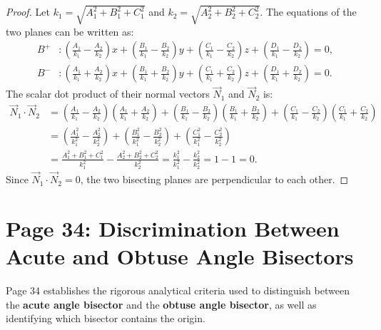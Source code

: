 \begin{proof}
Let $k_1 = \sqrt{A_1^2+B_1^2+C_1^2}$ and $k_2 = \sqrt{A_2^2+B_2^2+C_2^2}$.
The equations of the two planes can be written as:
\begin{align}
    B^+ &: \left(\frac{A_1}{k_1} - \frac{A_2}{k_2}\right)x + \left(\frac{B_1}{k_1} - \frac{B_2}{k_2}\right)y + \left(\frac{C_1}{k_1} - \frac{C_2}{k_2}\right)z + \left(\frac{D_1}{k_1} - \frac{D_2}{k_2}\right) = 0, \\
    B^- &: \left(\frac{A_1}{k_1} + \frac{A_2}{k_2}\right)x + \left(\frac{B_1}{k_1} + \frac{B_2}{k_2}\right)y + \left(\frac{C_1}{k_1} + \frac{C_2}{k_2}\right)z + \left(\frac{D_1}{k_1} + \frac{D_2}{k_2}\right) = 0.
\end{align}
The scalar dot product of their normal vectors $\vec{N}_1$ and $\vec{N}_2$ is:
\begin{align}
    \vec{N}_1 \cdot \vec{N}_2 &= \left(\frac{A_1}{k_1} - \frac{A_2}{k_2}\right)\left(\frac{A_1}{k_1} + \frac{A_2}{k_2}\right) + \left(\frac{B_1}{k_1} - \frac{B_2}{k_2}\right)\left(\frac{B_1}{k_1} + \frac{B_2}{k_2}\right) + \left(\frac{C_1}{k_1} - \frac{C_2}{k_2}\right)\left(\frac{C_1}{k_1} + \frac{C_2}{k_2}\right) \nonumber\\
    &= \left(\frac{A_1^2}{k_1^2} - \frac{A_2^2}{k_2^2}\right) + \left(\frac{B_1^2}{k_1^2} - \frac{B_2^2}{k_2^2}\right) + \left(\frac{C_1^2}{k_1^2} - \frac{C_2^2}{k_2^2}\right) \nonumber\\
    &= \frac{A_1^2 + B_1^2 + C_1^2}{k_1^2} - \frac{A_2^2 + B_2^2 + C_2^2}{k_2^2} = \frac{k_1^2}{k_1^2} - \frac{k_2^2}{k_2^2} = 1 - 1 = \boxed{0}.
\end{align}
Since $\vec{N}_1 \cdot \vec{N}_2 = 0$, the two bisecting planes are perpendicular to each other.
\end{proof}

\section{Page 34: Discrimination Between Acute and Obtuse Angle Bisectors}
\label{sec:page34}

\begin{conceptbox}
Page 34 establishes the rigorous analytical criteria used to distinguish between the \textbf{acute angle bisector} and the \textbf{obtuse angle bisector}, as well as identifying which bisector contains the origin.
\end{conceptbox}

